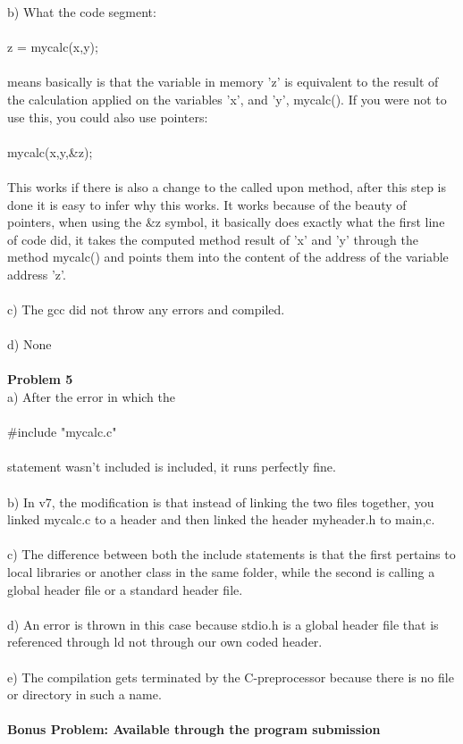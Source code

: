 \documentclass[12pt]{article}
\newcommand{\tab}[0]{\indent \indent}
\newcommand{\enter}[0]{\\ \tab}
\begin{document}
\tab b) What the code segment: \\ \enter \tab z = mycalc(x,y); \\ \enter means basically is that the variable in memory 'z' is equivalent to the result of the \tab calculation applied on the variables 'x', and 'y', mycalc(). If you were not to use this, \tab you could also use pointers: \\ \enter \tab mycalc(x,y,\&z); 
\\ \enter This works if there is also a change to the called upon method, after this step is \tab done it is easy to infer why this works. It works because of the beauty of pointers, \tab when using the \&z symbol, it basically does exactly what the first line of code did, \tab it takes the computed method result of 'x' and 'y' through the method mycalc() and \tab points them into the content of the address of the variable address 'z'. \\\\
\tab c) The gcc did not throw any errors and compiled.\\\\
\tab d) None \\\\
\indent \textbf{Problem 5} \\ \tab a) After the error in which the \\ \enter \#include "mycalc.c" \\ \enter statement wasn't included is included, it runs perfectly fine. \\\\
\tab b) In v7, the modification is that instead of linking the two files together, you linked \tab mycalc.c to a header and then linked the header myheader.h to main,c. \\\\
\tab c) The difference between both the include statements is that the first pertains to \tab local libraries or another class in the same folder, while the second is calling a global \tab header file or a standard header file. \\\\
\tab d) An error is thrown in this case because stdio.h is a global header file that is \tab referenced through ld not through our own coded header. \\\\
\tab e) The compilation gets terminated by the C-preprocessor because there is no file \tab or directory in such a name. \\\\
\textbf{Bonus Problem: Available through the program submission}
\end{document}
